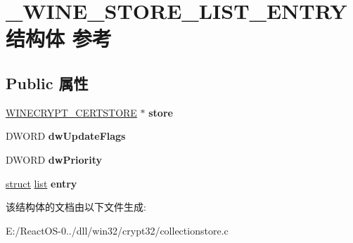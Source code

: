 \hypertarget{struct___w_i_n_e___s_t_o_r_e___l_i_s_t___e_n_t_r_y}{}\section{\+\_\+\+W\+I\+N\+E\+\_\+\+S\+T\+O\+R\+E\+\_\+\+L\+I\+S\+T\+\_\+\+E\+N\+T\+R\+Y结构体 参考}
\label{struct___w_i_n_e___s_t_o_r_e___l_i_s_t___e_n_t_r_y}
\subsection*{Public 属性}
\begin{DoxyCompactItemize}
\item 
\mbox{\label{struct___w_i_n_e___s_t_o_r_e___l_i_s_t___e_n_t_r_y_af25a7736010a76cb5f39374d81c864e0}} 
\hyperlink{struct_w_i_n_e___c_r_y_p_t_c_e_r_t_s_t_o_r_e}{W\+I\+N\+E\+C\+R\+Y\+P\+T\+\_\+\+C\+E\+R\+T\+S\+T\+O\+RE} $\ast$ {\bfseries store}
\item 
\mbox{\label{struct___w_i_n_e___s_t_o_r_e___l_i_s_t___e_n_t_r_y_a36617ef017b8769b52970e48daaf09e5}} 
D\+W\+O\+RD {\bfseries dw\+Update\+Flags}
\item 
\mbox{\label{struct___w_i_n_e___s_t_o_r_e___l_i_s_t___e_n_t_r_y_accbd4e4cc39f55c88f1a8e12eba5e3b7}} 
D\+W\+O\+RD {\bfseries dw\+Priority}
\item 
\mbox{\label{struct___w_i_n_e___s_t_o_r_e___l_i_s_t___e_n_t_r_y_a7d8f930ec6aa276bf579a9c7703efb82}} 
\hyperlink{interfacestruct}{struct} \hyperlink{classlist}{list} {\bfseries entry}
\end{DoxyCompactItemize}


该结构体的文档由以下文件生成\+:\begin{DoxyCompactItemize}
\item 
E\+:/\+React\+O\+S-\/0../dll/win32/crypt32/collectionstore.\+c\end{DoxyCompactItemize}
